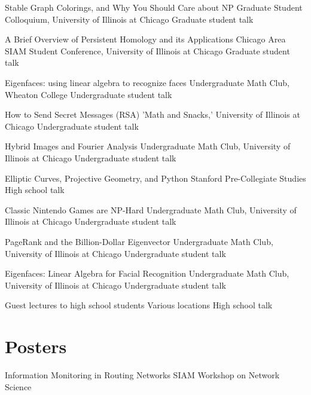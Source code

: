 \documentclass[11pt]{moderncv}
\begin{document}
         {Stable Graph Colorings, and Why You Should Care about NP}
      {Graduate Student Colloquium, University of Illinois at Chicago}
      {Graduate student talk}
      {}
{}

         {A Brief Overview of Persistent Homology and its Applications}
      {Chicago Area SIAM Student Conference, University of Illinois at Chicago}
      {Graduate student talk}
      {}
{}

         {Eigenfaces: using linear algebra to recognize faces}
      {Undergraduate Math Club, Wheaton College}
      {Undergraduate student talk}
      {}
{}

         {How to Send Secret Messages (RSA)}
      {'Math and Snacks,' University of Illinois at Chicago}
      {Undergraduate student talk}
      {}
{}

         {Hybrid Images and Fourier Analysis}
      {Undergraduate Math Club, University of Illinois at Chicago}
      {Undergraduate student talk}
      {}
{}

         {Elliptic Curves, Projective Geometry, and Python}
      {Stanford Pre-Collegiate Studies}
      {High school talk}
      {}
{}

         {Classic Nintendo Games are NP-Hard}
      {Undergraduate Math Club, University of Illinois at Chicago}
      {Undergraduate student talk}
      {}
{}

         {PageRank and the Billion-Dollar Eigenvector}
      {Undergraduate Math Club, University of Illinois at Chicago}
      {Undergraduate student talk}
      {}
{}

         {Eigenfaces: Linear Algebra for Facial Recognition}
      {Undergraduate Math Club, University of Illinois at Chicago}
      {Undergraduate student talk}
      {}
{}

         {Guest lectures to high school students}
      {Various locations}
      {High school talk}
      {}
{}


   \section{Posters}
         {Information Monitoring in Routing Networks}
      {}
      {SIAM Workshop on Network Science}
      {}
      {}
\end{document}
